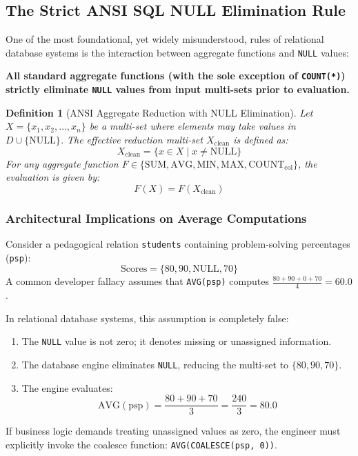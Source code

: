 \documentclass[10pt,twocolumn,letterpaper]{article}
\newtheorem{definition}[theorem]{Definition}
\begin{document}
\subsection{The Strict ANSI SQL NULL Elimination Rule}
One of the most foundational, yet widely misunderstood, rules of relational database systems is the interaction between aggregate functions and \texttt{NULL} values:
\begin{center}
\textbf{All standard aggregate functions (with the sole exception of \texttt{COUNT(*)}) strictly eliminate \texttt{NULL} values from input multi-sets prior to evaluation.}
\end{center}

\begin{definition}[ANSI Aggregate Reduction with NULL Elimination]
Let $X = \{x_1, x_2, \dots, x_n\}$ be a multi-set where elements may take values in $D \cup \{\text{NULL}\}$. The effective reduction multi-set $X_{\text{clean}}$ is defined as:
\begin{equation}
X_{\text{clean}} = \{ x \in X \mid x \neq \text{NULL} \}
\end{equation}
For any aggregate function $F \in \{\text{SUM}, \text{AVG}, \text{MIN}, \text{MAX}, \text{COUNT}_{\text{col}}\}$, the evaluation is given by:
\begin{equation}
F(X) = F(X_{\text{clean}})
\end{equation}
\end{definition}

\subsubsection{Architectural Implications on Average Computations}
Consider a pedagogical relation \texttt{students} containing problem-solving percentages (\texttt{psp}):
\begin{equation*}
\text{Scores} = \{80, 90, \text{NULL}, 70\}
\end{equation*}
A common developer fallacy assumes that \texttt{AVG(psp)} computes $\frac{80 + 90 + 0 + 70}{4} = 60.0$. 

In relational database systems, this assumption is completely false:
\begin{enumerate}
    \item The \texttt{NULL} value is not zero; it denotes missing or unassigned information.
    \item The database engine eliminates \texttt{NULL}, reducing the multi-set to $\{80, 90, 70\}$.
    \item The engine evaluates:
    \begin{equation}
    \text{AVG}(\text{psp}) = \frac{80 + 90 + 70}{3} = \frac{240}{3} = 80.0
    \end{equation}
\end{enumerate}
If business logic demands treating unassigned values as zero, the engineer must explicitly invoke the coalesce function: \texttt{AVG(COALESCE(psp, 0))}.
\end{document}
